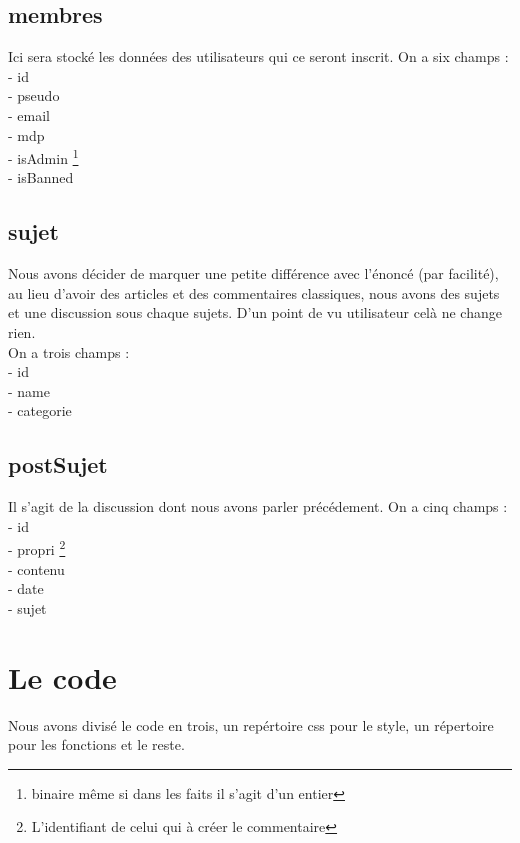 \documentclass{article}
\begin{document}
    \subsection{membres}
    Ici sera stocké les données des utilisateurs qui ce seront inscrit. On a six champs : \\
    - id \\ 
    - pseudo \\ 
    - email \\
    - mdp \\ 
    - isAdmin \footnote{binaire même si dans les faits il s'agit d'un entier}  \\
    - isBanned \footnotemark[2] \\ 
    \subsection{sujet}
    Nous avons décider de marquer une petite différence avec l'énoncé (par facilité),
    au lieu d'avoir des articles et des commentaires classiques, nous avons des sujets et une discussion sous chaque sujets.
    D'un point de vu utilisateur celà ne change rien. \\ 
    On a trois champs : \\
    - id \\
    - name \\ 
    - categorie 
    \subsection{postSujet}
    Il s'agit de la discussion dont nous avons parler précédement. On a cinq champs : \\
    - id \\ 
    - propri \footnote{L'identifiant de celui qui à créer le commentaire} \\
    - contenu \\ 
    - date \\
    - sujet \\ 
    \newpage 
    \section{Le code}
    Nous avons divisé le code en trois, un repértoire css pour le style, un répertoire pour les fonctions et le reste. 
\end{document}
